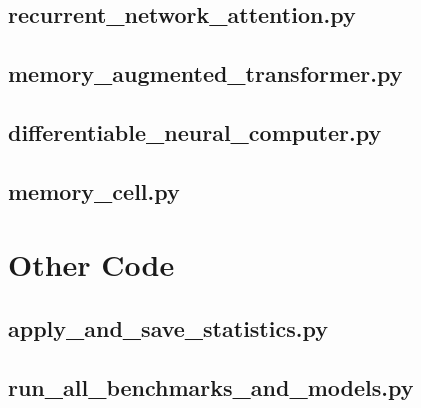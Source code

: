 \documentclass[draft,final]{vutinfth} %
\begin{document}
\subsection{recurrent\_network\_attention.py}


\subsection{memory\_augmented\_transformer.py}


\subsection{differentiable\_neural\_computer.py}


\subsection{memory\_cell.py}



\section{Other Code}

\subsection{apply\_and\_save\_statistics.py}


\subsection{run\_all\_benchmarks\_and\_models.py}




\end{document}
